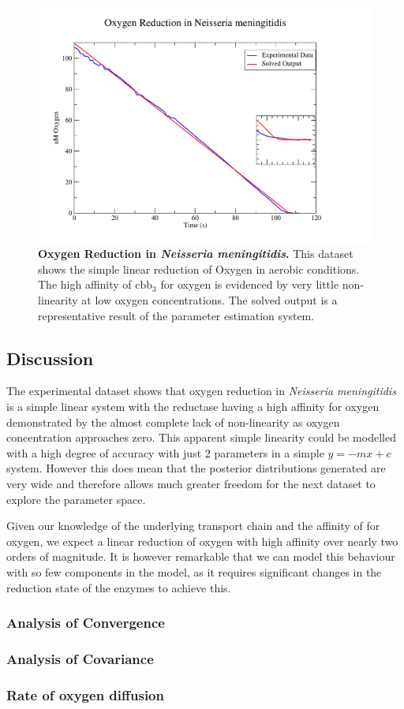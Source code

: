 \begin{figure}[tbp]
 \centering
 \includegraphics[width=14cm, trim=2cm 1cm 4cm 1cm]{./05-oxygenreduction/data/o2sim.pdf}
 \caption[{Oxygen Reduction in \textit{Neisseria meningitidis}.}]{{\bf Oxygen Reduction in \textit{Neisseria meningitidis}.} This dataset shows the simple linear reduction of Oxygen in aerobic conditions. The high affinity of $\mathrm{cbb}_3$ for oxygen is evidenced by very little non-linearity at low oxygen concentrations. The solved output is a representative result of the parameter estimation system.
 \label{fig:o2sim}}
\end{figure}

\subsection{Discussion}
The experimental dataset shows that oxygen reduction in \textit{Neisseria meningitidis} is a simple linear system with the reductase having a high affinity for oxygen demonstrated by the almost complete lack of non-linearity as oxygen concentration approaches zero. This apparent simple linearity could be modelled with a high degree of accuracy with just 2 parameters in a simple $y=-mx+c$ system. However this does mean that the posterior distributions generated are very wide and therefore allows much greater freedom for the next dataset to explore the parameter space.

Given our knowledge of the underlying transport chain and the affinity of \cbbthree{} for oxygen, we expect a linear reduction of oxygen with high affinity over nearly two orders of magnitude. It is however remarkable that we can model this behaviour with so few components in the model, as it requires significant changes in the reduction state of the enzymes to achieve this.

\subsubsection{Analysis of Convergence}
\subsubsection{Analysis of Covariance}

\subsubsection{Rate of oxygen diffusion}